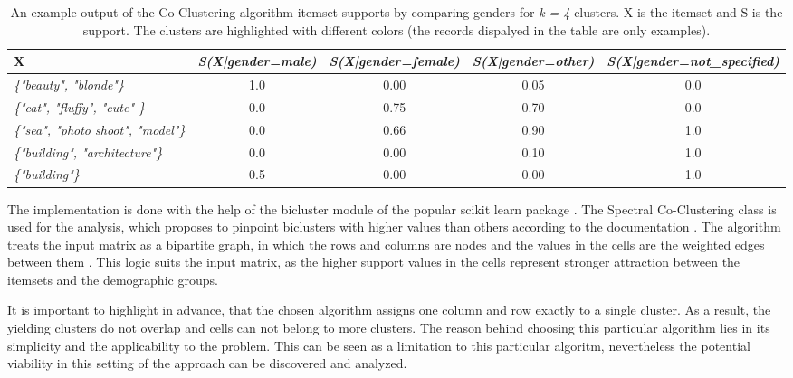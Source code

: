     \begin{table}[H]
        \centering
        \begin{adjustbox}{width=1\textwidth}
            \begin{tabular}{l|c|c|c|c}
                X & \emph{S(X|gender=male)} & \emph{S(X|gender=female)} & \emph{S(X|gender=other)} & \emph{S(X|gender=not\_specified)} \\
                \hline
                \emph{\{"beauty", "blonde"\}} & \cellcolor{blue!25}1.0 &  0.00 &  0.05 &  0.0 \\
                \emph{\{"cat", "fluffy", "cute" \}} &  0.0 & \cellcolor{red!25}0.75 & \cellcolor{red!25}0.70 &  0.0 \\
                \emph{\{"sea", "photo shoot", "model"\}} &  0.0 & \cellcolor{red!25}0.66 & \cellcolor{red!25}0.90 & \cellcolor{green!25}1.0 \\
                \emph{\{"building", "architecture"\}} &  0.0 &  0.00 &  0.10 & \cellcolor{green!25}1.0 \\
                \emph{\{"building"\}} &  0.5 &  0.00 &  0.00 & \cellcolor{green!25}1.0
            \end{tabular}
        \end{adjustbox}
        \caption{An example output of the Co-Clustering algorithm itemset supports by comparing genders for \emph{k = 4} clusters. X is the itemset and S is the support. The clusters are highlighted with different colors (the records dispalyed in the table are only examples).}
        \label{coclustering_output_format}
    \end{table}
    
    The implementation is done with the help of the bicluster module \cite{scikit-bicluster} of the popular scikit learn package \cite{scikit-learn}. The Spectral Co-Clustering class is used for the analysis, which proposes to pinpoint biclusters with higher values than others according to the documentation \cite{scikit-bicluster}. The algorithm treats the input matrix as a bipartite graph, in which the rows and columns are nodes and the values in the cells are the weighted edges between them \cite{scikit-bicluster}. This logic suits the input matrix, as the higher support values in the cells represent stronger attraction between the itemsets and the demographic groups.

    It is important to highlight in advance, that the chosen algorithm assigns one column and row exactly to a single cluster. As a result, the yielding clusters do not overlap and cells can not belong to more clusters. The reason behind choosing this particular algorithm lies in its simplicity and the applicability to the problem. This can be seen as a limitation to this particular algoritm, nevertheless the potential viability in this setting of the approach can be discovered and analyzed. 


